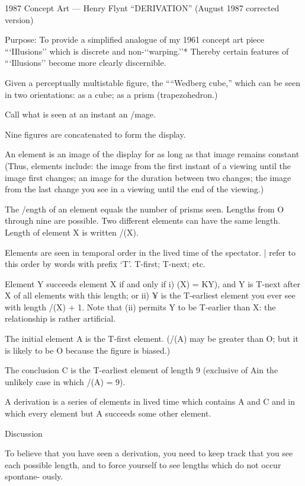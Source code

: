 1987 Concept Art — Henry Flynt 
“DERIVATION” (August 1987 corrected version) 


Purpose: To provide a simplified analogue of my 1961 concept art piece “‘IIlusions’’ which is 
discrete and non-‘‘warping.’’* Thereby certain features of “‘Illusions’’ become more 
clearly discernible. 


Given a perceptually multistable figure, the ““Wedberg cube,” which can be seen in two 
orientations: as a cube; as a prism (trapezohedron.) 

Call what is seen at an instant an /mage. 

Nine figures are concatenated to form the display. 


An element is an image of the display for as long as that image remains constant (Thus, 
elements include: the image from the first instant of a viewing until the image first 
changes; an image for the duration between two changes; the image from the last 
change you see in a viewing until the end of the viewing.) 


The /ength of an element equals the number of prisms seen. Lengths from O through nine 
are possible. Two different elements can have the same length. Length of element X 
is written /(X). 


Elements are seen in temporal order in the lived time of the spectator. | refer to this order by 
words with prefix ‘T’. T-first; T-next; etc. 


Element Y succeeds element X if and only if 
i) (X) = KY), and Y is T-next after X of all elements with this length; or 
ii) ¥ is the T-earliest element you ever see with length /(X) + 1. 
Note that (ii) permits Y to be T-earlier than X: the relationship is rather artificial. 


The initial element A is the T-first element. (/(A) may be greater than O; but it is likely to be O 
because the figure is biased.) 


The conclusion C is the T-earliest element of length 9 (exclusive of Ain the unlikely case in 
which /(A) = 9). 


A derivation is a series of elements in lived time which contains A and C and in which every 
element but A succeeds some other element. 


Discussion 

To believe that you have seen a derivation, you need to keep track that you see each 
possible length, and to force yourself to see lengths which do not occur spontane- 
ously. 


